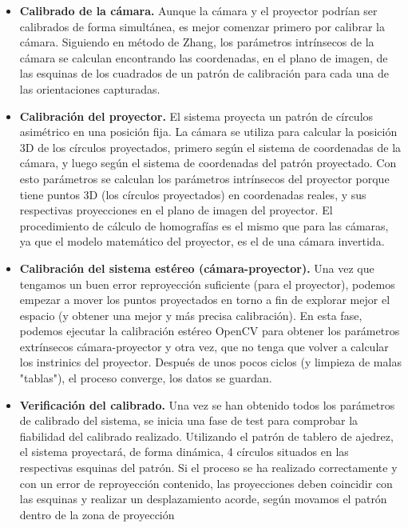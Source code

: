 \begin{itemize}
\item\textbf{Calibrado de la cámara. } Aunque la cámara y el proyector podrían ser calibrados de forma simultánea, es mejor comenzar primero por calibrar la cámara. Siguiendo en método de Zhang, los parámetros intrínsecos de la cámara se calculan encontrando las coordenadas, en el plano de imagen, de las esquinas de los cuadrados de un patrón de calibración para cada una de las orientaciones capturadas.

\item\textbf{Calibración del proyector. } El sistema proyecta un patrón de círculos asimétrico en una posición fija. La cámara se utiliza para calcular la posición 3D de los círculos proyectados, primero según el sistema de coordenadas de la cámara, y luego según el sistema de coordenadas del patrón proyectado. Con esto parámetros se calculan los parámetros intrínsecos del proyector porque tiene puntos 3D (los círculos proyectados) en coordenadas reales, y sus respectivas proyecciones en el plano de imagen del proyector. El procedimiento de cálculo de homografías es el mismo que para las cámaras, ya que el modelo matemático del proyector, es el de una cámara invertida. 

\item\textbf{Calibración del sistema estéreo (cámara-proyector). } Una vez que tengamos un buen error reproyección suficiente (para el proyector), podemos empezar a mover los puntos proyectados en torno a fin de explorar mejor el espacio (y obtener una mejor y más precisa calibración). En esta fase, podemos ejecutar la calibración estéreo OpenCV para obtener los parámetros extrínsecos cámara-proyector y otra vez, que no tenga que volver a calcular los instrinics del proyector. Después de unos pocos ciclos (y limpieza de malas "tablas"), el proceso converge, los datos se guardan.

\item\textbf{Verificación del calibrado. } Una vez se han obtenido todos los parámetros de calibrado del sistema, se inicia una fase de test para comprobar la fiabilidad del calibrado realizado. Utilizando el patrón de tablero de ajedrez, el sistema proyectará, de forma dinámica, 4 círculos situados en las respectivas esquinas del patrón. Si el proceso se ha realizado correctamente y con un error de reproyección contenido, las proyecciones deben coincidir con las esquinas y realizar un desplazamiento acorde, según movamos el patrón dentro de la zona de proyección 
\end{itemize}

